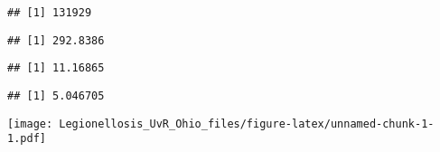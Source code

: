 \documentclass[]{article}
\newenvironment{Shaded}{\begin{snugshade}}{\end{snugshade}}
\newcommand{\CommentTok}[1]{\textcolor[rgb]{0.56,0.35,0.01}{\textit{#1}}}
\newcommand{\DecValTok}[1]{\textcolor[rgb]{0.00,0.00,0.81}{#1}}
\newcommand{\KeywordTok}[1]{\textcolor[rgb]{0.13,0.29,0.53}{\textbf{#1}}}
\newcommand{\NormalTok}[1]{#1}
\newcommand{\OperatorTok}[1]{\textcolor[rgb]{0.81,0.36,0.00}{\textbf{#1}}}
\begin{document}
\begin{verbatim}
## [1] 131929
\end{verbatim}

\begin{Shaded}
\end{Shaded}

\begin{verbatim}
## [1] 292.8386
\end{verbatim}

\begin{Shaded}
\end{Shaded}

\begin{verbatim}
## [1] 11.16865
\end{verbatim}

\begin{Shaded}
\end{Shaded}

\begin{verbatim}
## [1] 5.046705
\end{verbatim}

\begin{Shaded}
\end{Shaded}

\texttt{[image: Legionellosis\_UvR\_Ohio\_files/figure-latex/unnamed-chunk-1-1.pdf]}

\begin{Shaded}
\end{Shaded}
\end{document}
